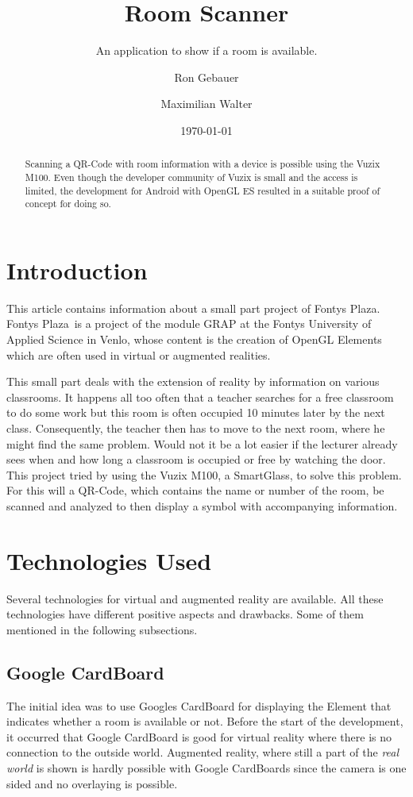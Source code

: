 \documentclass[11pt]{scrartcl}
\title{Room Scanner}
\subtitle{An application to show if a room is available.}
\author{Ron Gebauer \and Maximilian Walter}
\date{\today}
\begin{document}
\maketitle
\nocite{*}
\begin{abstract}
	Scanning a QR-Code with room information with a device is possible using the Vuzix M100. Even though the developer community of Vuzix is small and the access is limited, the development for Android with OpenGL ES resulted in a suitable proof of concept for doing so. 
\end{abstract}

\begin{multicols}{2}
	\section{Introduction}
	This article contains information about a small part project of \glqq Fontys Plaza\grqq. \glqq Fontys Plaza\grqq\ is a project of the module GRAP at the Fontys University of Applied Science in Venlo, whose content is the creation of OpenGL Elements which are often used in virtual or augmented realities.
	
	This small part deals with the extension of reality by information on various classrooms. It happens all too often that a teacher searches for a free classroom to do some work but this room is often occupied 10 minutes later by the next class. Consequently, the teacher then has to move to the next room, where he might find the same problem. Would not it be a lot easier if the lecturer already sees when and how long a classroom is occupied or free by watching the door.
	This project tried by using the Vuzix M100, a SmartGlass, to solve this problem. For this will a QR-Code, which contains the name or number of the room, be scanned and analyzed to then display a symbol with accompanying information.
	
	\section{Technologies Used}
	Several technologies for virtual and augmented reality are available. All these technologies have different positive aspects and drawbacks. Some of them mentioned in the following subsections.
		\subsection{Google CardBoard}
			The initial idea was to use Googles CardBoard for displaying the Element that indicates whether a room is available or not. Before the start of the development, it occurred that Google CardBoard is good for virtual reality where there is no connection to the outside world. Augmented reality, where still a part of the \emph{real world} is shown is hardly possible with Google CardBoards since the camera is one sided and no overlaying is possible.
	

\end{multicols}
\end{document}

